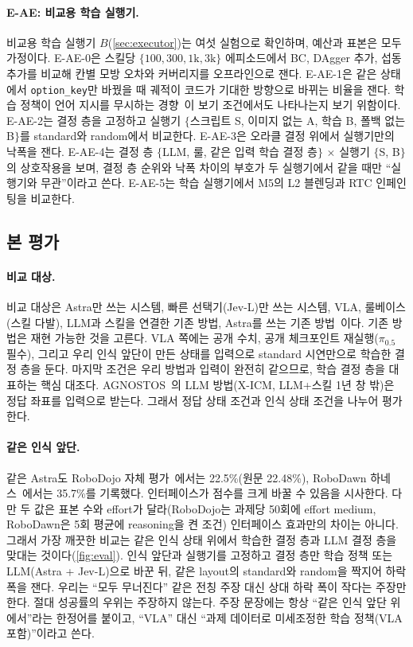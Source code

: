 \paragraph{E-AE: 비교용 학습 실행기.}
비교용 학습 실행기 $B$(\cref{sec:executor})는 여섯 실험으로 확인하며, 예산과 표본은 모두 가정이다. E-AE-0은 스킬당 $\{100, 300, 1\text{k}, 3\text{k}\}$ 에피소드에서 BC, DAgger 추가, 섭동 추가를 비교해 칸별 모방 오차와 커버리지를 오프라인으로 잰다. E-AE-1은 같은 상태에서 \texttt{option\_key}만 바꿨을 때 궤적이 코드가 기대한 방향으로 바뀌는 비율을 잰다. 학습 정책이 언어 지시를 무시하는 경향~\cite{liberoplus2025}이 보기 조건에서도 나타나는지 보기 위함이다. E-AE-2는 결정 층을 고정하고 실행기 $\{$스크립트 S, 이미지 없는 A, 학습 B, 폴백 없는 B$\}$를 standard와 random에서 비교한다. E-AE-3은 오라클 결정 위에서 실행기만의 낙폭을 잰다. E-AE-4는 결정 층 $\{$LLM, 룰, 같은 입력 학습 결정 층$\}$ $\times$ 실행기 $\{$S, B$\}$의 상호작용을 보며, 결정 층 순위와 낙폭 차이의 부호가 두 실행기에서 같을 때만 ``실행기와 무관''이라고 쓴다. E-AE-5는 학습 실행기에서 M5의 L2 블렌딩과 RTC 인페인팅을 비교한다.

\subsection{본 평가}

\paragraph{비교 대상.}
비교 대상은 Astra만 쓰는 시스템, 빠른 선택기(Jev-L)만 쓰는 시스템, VLA, 룰베이스(스킬 다발), LLM과 스킬을 연결한 기존 방법, Astra를 쓰는 기존 방법~\cite{agp2026,harnessvla2026}이다. 기존 방법은 재현 가능한 것을 고른다. VLA 쪽에는 공개 수치, 공개 체크포인트 재실행($\pi_{0.5}$ 필수), 그리고 우리 인식 앞단이 만든 상태를 입력으로 standard 시연만으로 학습한 결정 층을 둔다. 마지막 조건은 우리 방법과 입력이 완전히 같으므로, 학습 결정 층을 대표하는 핵심 대조다. AGNOSTOS~\cite{agnostos2025}의 LLM 방법(X-ICM, LLM+스킬 1년 창 밖)은 정답 좌표를 입력으로 받는다. 그래서 정답 상태 조건과 인식 상태 조건을 나누어 평가한다.

\paragraph{같은 인식 앞단.}
같은 Astra도 RoboDojo 자체 평가~\cite{robodojo2026}에서는 22.5\%(원문 22.48\%), RoboDawn 하네스~\cite{robodawn2026}에서는 35.7\%를 기록했다. 인터페이스가 점수를 크게 바꿀 수 있음을 시사한다. 다만 두 값은 표본 수와 effort가 달라(RoboDojo는 과제당 50회에 effort medium, RoboDawn은 5회 평균에 reasoning을 켠 조건) 인터페이스 효과만의 차이는 아니다. 그래서 가장 깨끗한 비교는 같은 인식 상태 위에서 학습한 결정 층과 LLM 결정 층을 맞대는 것이다(\cref{fig:eval}). 인식 앞단과 실행기를 고정하고 결정 층만 학습 정책 또는 LLM(Astra + Jev-L)으로 바꾼 뒤, 같은 layout의 standard와 random을 짝지어 하락 폭을 잰다. 우리는 ``모두 무너진다'' 같은 전칭 주장 대신 상대 하락 폭이 작다는 주장만 한다. 절대 성공률의 우위는 주장하지 않는다. 주장 문장에는 항상 ``같은 인식 앞단 위에서''라는 한정어를 붙이고, ``VLA'' 대신 ``과제 데이터로 미세조정한 학습 정책(VLA 포함)''이라고 쓴다.

